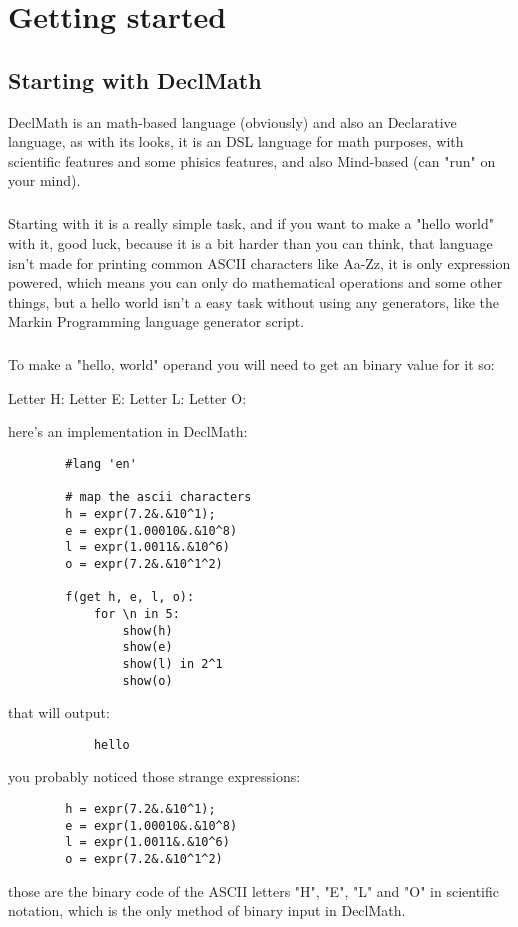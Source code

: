 \documentclass{book}
\begin{document}
\chapter{Getting started}
    \section{Starting with DeclMath}
    DeclMath is an math-based language (obviously) and also an Declarative language,
    as with its looks, it is an DSL language for math purposes, with scientific features
    and some phisics features, and also Mind-based (can "run" on your mind).
    \paragraph{}
    Starting with it is a really simple task, and if you want to make a "hello world"
    with it, good luck, because it is a bit harder than you can think, that language isn't
    made for printing common ASCII characters like Aa-Zz, it is only expression powered,
    which means you can only do mathematical operations and some other things, but a hello world
    isn't a easy task without using any generators, like the Markin Programming language generator
    script.
    \paragraph{}
    To make a "hello, world" operand you will need to get an binary value for it
    so:

    Letter H:
     \eq {}
    Letter E:
     \eq {}
    Letter L:
     \eq {}
    Letter O:
     \eq {}

    here's an implementation in DeclMath:

    \begin{lstlisting}
        #lang 'en'

        # map the ascii characters
        h = expr(7.2&.&10^1);
        e = expr(1.00010&.&10^8)
        l = expr(1.0011&.&10^6)
        o = expr(7.2&.&10^1^2)

        f(get h, e, l, o):
            for \n in 5:
                show(h)
                show(e)
                show(l) in 2^1
                show(o) 
    \end{lstlisting}

    that will output:
        \begin{lstlisting}
            hello
        \end{lstlisting}

    you probably noticed those strange expressions:
    \begin{lstlisting}
        h = expr(7.2&.&10^1);
        e = expr(1.00010&.&10^8)
        l = expr(1.0011&.&10^6)
        o = expr(7.2&.&10^1^2)
    \end{lstlisting}

    those are the binary code of the ASCII letters "H", "E", "L" and "O"
    in scientific notation, which is the only method of binary input in DeclMath.

    
\end{document}
